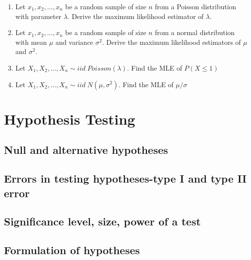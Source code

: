 \documentclass[]{book}
\begin{document}
\begin{enumerate}
\def\labelenumi{\arabic{enumi}.}
\setcounter{enumi}{6}
\item
  Let \(x_1, x_2, \dots, x_n\) be a random sample of size \(n\) from a Poisson distribution with parameter \(\lambda\). Derive the maximum likelihood estimator of \(\lambda\).
\item
  Let \(x_1, x_2, \dots, x_n\) be a random sample of size \(n\) from a normal distribution with mean \(\mu\) and variance \(\sigma^2\). Derive the maximum likelihood estimators of \(\mu\) and \(\sigma^2\).
\item
  Let \(X_1, X_2, \dots, X_n \sim iid \; Poisson (\lambda)\). Find the MLE of \(P(X\leq 1)\)
\item
  Let \(X_1, X_2, \dots, X_n \sim iid \; N (\mu, \sigma^2)\). Find the MLE of \(\mu/\sigma\)
\end{enumerate}

\hypertarget{hypothesis-testing}{%
\chapter{Hypothesis Testing}\label{hypothesis-testing}}

\hypertarget{null-and-alternative-hypotheses}{%
\section{Null and alternative hypotheses}\label{null-and-alternative-hypotheses}}

\hypertarget{errors-in-testing-hypotheses-type-i-and-type-ii-error}{%
\section{Errors in testing hypotheses-type I and type II error}\label{errors-in-testing-hypotheses-type-i-and-type-ii-error}}

\hypertarget{significance-level-size-power-of-a-test}{%
\section{Significance level, size, power of a test}\label{significance-level-size-power-of-a-test}}

\hypertarget{formulation-of-hypotheses}{%
\section{Formulation of hypotheses}\label{formulation-of-hypotheses}}
\end{document}
